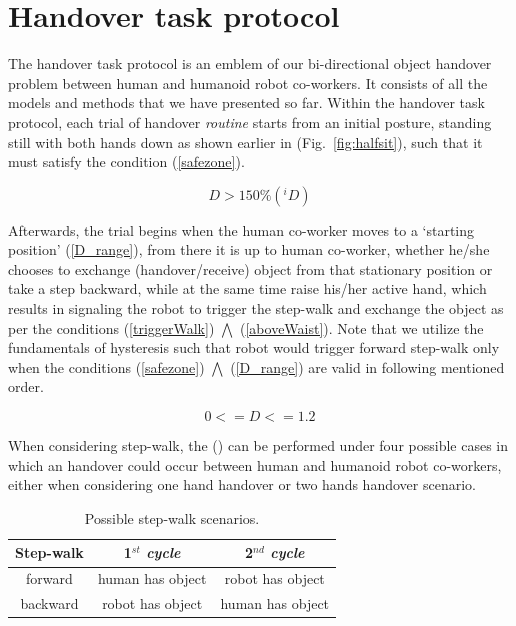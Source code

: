 \clearpage

\section{Handover task protocol}

The handover task protocol is an emblem of our bi-directional object handover problem between human and humanoid robot co-workers. It consists of all the models and methods that we have presented so far. Within the handover task protocol, each trial of handover \textit{routine} starts from an initial posture, standing still with both hands down as shown earlier in (Fig.~\ref{fig:halfsit}), such that it must satisfy the condition (\ref{safezone}). 

\begin{equation}\label{safezone}
D > 150\% ({ }{}^{i}D) 
\end{equation}


Afterwards, the trial begins when the human co-worker moves to a `starting position' (\ref{D_range}), from there it is up to human co-worker, whether he/she chooses to exchange (handover/receive) object from that stationary position or take a step backward, while at the same time raise his/her active hand, which results in signaling the robot to trigger the step-walk and exchange the object as per the conditions (\ref{triggerWalk}) $\bigwedge$ (\ref{aboveWaist}). Note that we utilize the fundamentals of hysteresis such that robot would trigger forward step-walk only when the conditions (\ref{safezone}) $\bigwedge$ (\ref{D_range}) are valid in following mentioned order.

\begin{equation}\label{D_range}
0 <= D <= 1.2
\end{equation}

When considering step-walk, the () can be performed under four possible cases in which an handover could occur between human and humanoid robot co-workers, either when considering one hand handover or two hands handover scenario.

\begin{table}[hbt]
	\caption{Possible step-walk scenarios.}
	\label{walkTable}
	\begin{center}
		\begin{tabular}{|c | c | c|}
			\hline  
			{\bf Step-walk} & {\bf 1${}^{st}$ \textit{cycle}} & {\bf 2${}^{nd}$ \textit{cycle}} \\ 
			\hline			
			forward  & human has object &  robot has object \\ 
			\hline			
			backward & robot has object & human has object \\ 			
			\hline 			
		\end{tabular} 
	\end{center}
\end{table}

